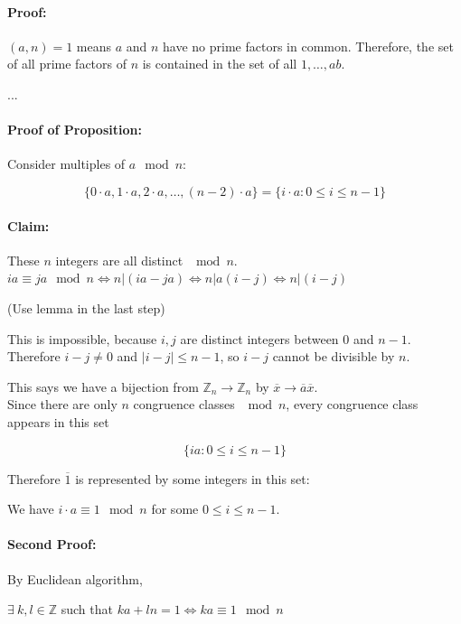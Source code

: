 \documentclass[a4paper, 11pt, twoside]{article}
\begin{document}
\paragraph{Proof:} $(a,n)=1$ means $a$ and $n$ have no prime factors in common. Therefore, the set of all prime factors of $n$ is contained in the set of all $1,\dots, ab$.

...\\

\paragraph{Proof of Proposition:} Consider multiples of $a \mod n$:

\[\{0\cdot a, 1\cdot a, 2\cdot a, \dots, (n-2)\cdot a\} = \{i\cdot a: 0\leq i\leq n-1\}\]

\paragraph{Claim:} These $n$ integers are all distinct $\mod n$.\\

$ia\equiv ja\mod n\iff n|(ia-ja)\iff n|a(i-j)\iff n|(i-j)$

(Use lemma in the last step)

This is impossible, because $i,j$ are distinct integers between $0$ and $n-1$. Therefore $i-j\not=0$ and $|i-j|\leq n-1$, so $i-j$ cannot be divisible by $n$.

This says we have a bijection from $\mathbb{Z}_n\rightarrow \mathbb{Z}_n$ by $\overline{x}\rightarrow \overline{a}\overline{x}.$\\

Since there are only $n$ congruence classes $\mod n$, every congruence class appears in this set

\[\{ia: 0\leq i \leq n-1\}\]

Therefore $\overline{1}$ is represented by some integers in this set:

We have $i\cdot a\equiv 1\mod n$ for some $0\leq i\leq n-1$.\\

\paragraph{Second Proof:}

By Euclidean algorithm,

 $\exists\ k, l\in\mathbb{Z}$ such that $ka+ln=1\iff ka\equiv 1\mod n$
 
\end{document}
